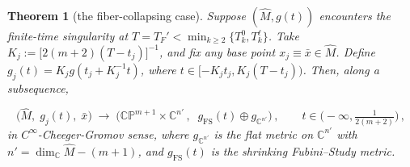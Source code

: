 \documentclass[11pt]{amsart}
\theoremstyle{plain}
\numberwithin{equation}{section}
\newtheorem{theorem}{Theorem}[section]
\theoremstyle{definition}
\theoremstyle{remark}
\begin{document}
\begin{theorem}[the fiber-collapsing case]\label{thm:fiber-collapse-model}
Suppose $(\widehat{M}, g(t))$ encounters the finite-time singularity at $T = T_F' < \min_{k \geq 2} \{T_k^0, T_k^\ell\}$. Take $K_j := \big[ 2 ( m + 2 ) ( T - t_j ) \big]^{-1}$, and fix any base point $x_j \equiv \bar{x} \in \widehat{M}$. Define $g_j(t) = K_jg(t_j + K_j^{-1}t)$, where $t \in [-K_jt_j, K_j(T-t_j))$. Then, along a subsequence,

\begin{equation}\label{eq:fiber-collapse-limit}
\big( \widehat{M}, \; g_j (t), \; \bar{x} \big) \;\longrightarrow\; \Big( \mathbb{CP}^{m+1} \times \mathbb{C}^{n'} \,, \;\; g_{\mathrm{FS}} (t) \oplus g_{\mathbb{C}^{n'}} \Big) \,, \qquad t \in \Big( - \infty, \tfrac{1}{2 ( m + 2 )} \Big) \,,
\end{equation}
in $C^\infty$-Cheeger-Gromov sense, where $g_{\mathbb{C}^{n'}}$ is the flat metric on $\mathbb{C}^{n'}$ with $n' = \dim_{\mathbb{C}}\widehat{M} - (m+1)$, and $g_{\mathrm{FS}} (t)$ is the shrinking Fubini--Study metric.

\end{theorem}
\end{document}

